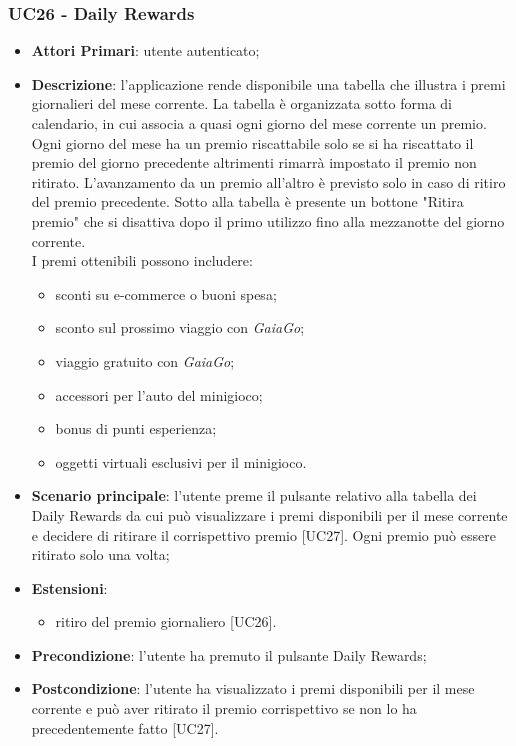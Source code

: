 \subsubsection{UC26 - Daily Rewards}
\begin{itemize}
	\item \textbf{Attori Primari}: utente autenticato;
	\item \textbf{Descrizione}: l'applicazione rende disponibile una tabella che illustra i premi giornalieri del mese corrente. La tabella è organizzata sotto forma di calendario, in cui associa a quasi ogni giorno del mese corrente un premio. Ogni giorno del mese ha un premio riscattabile solo se si ha riscattato il premio del giorno precedente altrimenti rimarrà impostato il premio non ritirato. L'avanzamento da un premio all'altro è previsto solo in caso di ritiro del premio precedente. 
	Sotto alla tabella è presente un bottone "Ritira premio" che si disattiva dopo il primo utilizzo fino alla mezzanotte del giorno corrente.\\
	I premi ottenibili possono includere:
	\begin{itemize}
		\item sconti su e-commerce o buoni spesa;
		\item sconto sul prossimo viaggio con \textit{GaiaGo};
		\item viaggio gratuito con \textit{GaiaGo};
		\item accessori per l'auto del minigioco;
		\item bonus di punti esperienza;
		\item oggetti virtuali esclusivi per il minigioco.
	\end{itemize}
	\item \textbf{Scenario principale}: l'utente preme il pulsante relativo alla tabella dei Daily Rewards da cui può visualizzare i premi disponibili per il mese corrente e decidere di ritirare il corrispettivo premio [UC27].
	Ogni premio può essere ritirato solo una volta;
	\item \textbf{Estensioni}: 
		\begin{itemize}
			\item ritiro del premio giornaliero [UC26].
		\end{itemize}
	\item \textbf{Precondizione}: l'utente ha premuto il pulsante Daily Rewards;
	\item \textbf{Postcondizione}: l'utente ha visualizzato i premi disponibili per il mese corrente e può aver ritirato il premio corrispettivo se non lo ha precedentemente fatto [UC27]. 
\end{itemize} 
